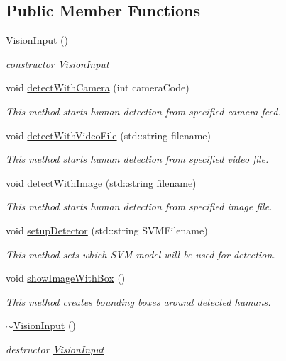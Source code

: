\subsection*{Public Member Functions}
\begin{DoxyCompactItemize}
\item 
\hyperlink{classVisionInput_aaea2418176f6766cfd7ae09f333d176a}{Vision\+Input} ()
\begin{DoxyCompactList}\small\item\em constructor \hyperlink{classVisionInput}{Vision\+Input} \end{DoxyCompactList}\item 
void \hyperlink{classVisionInput_a54caed2ca4579dbbf274b2730bf11a01}{detect\+With\+Camera} (int camera\+Code)
\begin{DoxyCompactList}\small\item\em This method starts human detection from specified camera feed. \end{DoxyCompactList}\item 
void \hyperlink{classVisionInput_a37b18210c09b26d1fb0cddf930882857}{detect\+With\+Video\+File} (std\+::string filename)
\begin{DoxyCompactList}\small\item\em This method starts human detection from specified video file. \end{DoxyCompactList}\item 
void \hyperlink{classVisionInput_a6e00b038651a43978a351c3a54d27005}{detect\+With\+Image} (std\+::string filename)
\begin{DoxyCompactList}\small\item\em This method starts human detection from specified image file. \end{DoxyCompactList}\item 
void \hyperlink{classVisionInput_ad7e80a1b7ee9f63cb56ee0b6a1e96351}{setup\+Detector} (std\+::string S\+V\+M\+Filename)
\begin{DoxyCompactList}\small\item\em This method sets which S\+VM model will be used for detection. \end{DoxyCompactList}\item 
void \hyperlink{classVisionInput_ac76ded14c04baccb34d8cc3277258f68}{show\+Image\+With\+Box} ()
\begin{DoxyCompactList}\small\item\em This method creates bounding boxes around detected humans. \end{DoxyCompactList}\item 
\hyperlink{classVisionInput_ab7800dddb115d9ba6da676b496b03259}{$\sim$\+Vision\+Input} ()
\begin{DoxyCompactList}\small\item\em destructor \hyperlink{classVisionInput}{Vision\+Input} \end{DoxyCompactList}\end{DoxyCompactItemize}
